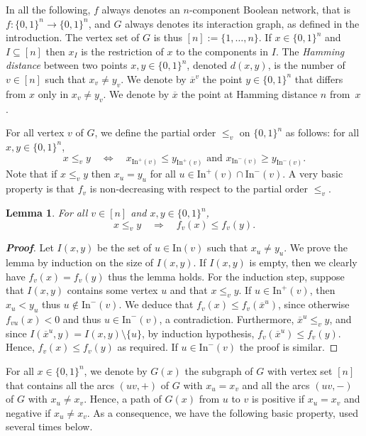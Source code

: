 \documentclass[11pt,a4paper]{article}
\newtheorem{lemma}{Lemma}
\def\B{\{0,1\}}
\def\In{\mathrm{In}}
\begin{document}
\medskip
In all the following, $f$ always denotes an $n$-component Boolean network, that is $f:\B^n\to\B^n$, and $G$ always denotes its interaction graph, as defined in the introduction. The vertex set of $G$ is thus $[n]:=\{1,\dots,n\}$. If $x\in\B^n$ and $I\subseteq [n]$ then $x_I$ is the restriction of $x$ to the components in $I$. The {\em Hamming distance} between two points $x,y\in\B^n$, denoted $d(x,y)$, is the number of $v\in [n]$ such that $x_v\neq y_v$. We denote by $\overline{x}^v$ the point $y\in\B^n$ that differs from $x$ only in $x_v\neq y_v$. We denote by $\overline{x}$ the point at Hamming distance $n$ from~$x$. 

\medskip
For all vertex $v$ of $G$, we define the partial order $\leq_v$ on $\B^n$ as follows: for all $x,y\in\B^n$, 
\[
x\leq_v y
\quad
\iff
\quad
x_{\In^+(v)}\leq y_{\In^+(v)}
\text{ and }
x_{\In^-(v)}\geq y_{\In^-(v)}.
\]
Note that if $x\leq_v y$ then $x_u=y_u$ for all $u\in\In^+(v)\cap\In^-(v)$. A very basic property is that $f_v$ is non-decreasing with respect to the partial order $\leq_v$. 

\begin{lemma}\label{local_lemma}
For all $v\in [n]$ and $x,y\in\B^n$,
\[
x\leq_v y
\quad
\Rightarrow
\quad
f_v(x)\leq f_v(y).
\]
\end{lemma}


\begin{proof}[{\bf Proof}]
Let $I(x,y)$ be the set of $u\in\In(v)$ such that $x_u\neq y_u$. We prove the lemma by induction on the size of $I(x,y)$. If $I(x,y)$ is empty, then we clearly have $f_v(x)=f_v(y)$ thus the lemma holds. For the induction step, suppose that $I(x,y)$ contains some vertex $u$ and that $x\leq_v y$. If $u\in\In^+(v)$, then $x_u<y_u$ thus $u\not\in\In^-(v)$. We deduce that $f_v(x)\leq f_v(\overline{x}^u)$, since otherwise $f_{vu}(x)<0$ and thus $u\in\In^-(v)$, a contradiction. Furthermore, $\overline{x}^u\leq_v y$, and since $I(\overline{x}^u,y)=I(x,y)\setminus\{u\}$, by induction hypothesis, $f_v(\overline{x}^u)\leq f_v(y)$. Hence, $f_v(x)\leq f_v(y)$ as required. If $u\in\In^-(v)$ the proof is similar.
\end{proof}

For all $x\in\B^n$, we denote by $G(x)$ the subgraph of $G$ with vertex set $[n]$ that contains all the  arcs $(uv,+)$ of $G$ with $x_u=x_v$ and all the arcs $(uv,-)$ of $G$ with $x_u\neq x_v$. Hence, a path of $G(x)$ from $u$ to $v$ is positive if $x_u=x_v$ and negative if $x_u\neq x_v$. As a consequence, we have the following basic property, used several times below.
\end{document}
